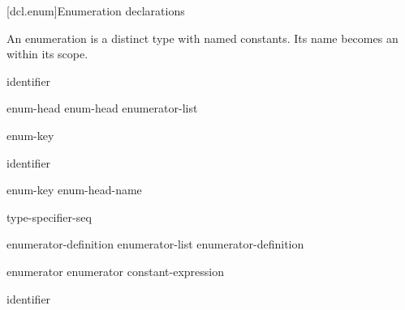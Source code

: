 [dcl.enum]{Enumeration declarations}%
%
%

\pnum
An enumeration is a distinct type with named
constants. Its name becomes an  within its scope.

\begin{bnf}
\br
    identifier
\end{bnf}

\begin{bnf}
\br
    enum-head \terminal{\{}  \terminal{\}}\br
    enum-head \terminal{\{} enumerator-list \terminal{, \}}
\end{bnf}

\begin{bnf}
\br
    enum-key   
\end{bnf}

\begin{bnf}
\br
     identifier
\end{bnf}

\begin{bnf}
\br
    enum-key  enum-head-name  \terminal{;}
\end{bnf}

\begin{bnf}
\br
    \br
    \br
\end{bnf}

\begin{bnf}
\br
    \terminal{:} type-specifier-seq
\end{bnf}

\begin{bnf}
\br
    enumerator-definition\br
    enumerator-list \terminal{,} enumerator-definition
\end{bnf}

\begin{bnf}
\br
    enumerator\br
    enumerator \terminal{=} constant-expression
\end{bnf}

\begin{bnf}
\br
    identifier 
\end{bnf}


